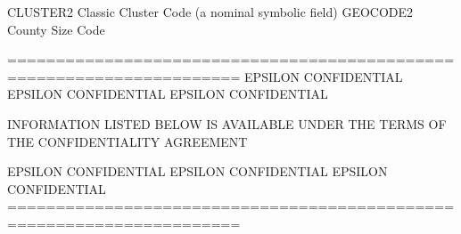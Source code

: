 \documentclass[
  11pt,
  a4paper,
  DIV=12,captions=tableheading,oneside,titlepage]{scrbook}
\let\oldverbatim\verbatim
\let\endoldverbatim\endverbatim
\renewenvironment{verbatim}{\footnotesize\oldverbatim}{\endoldverbatim}
\begin{document}
\begin{verbatim}
CLUSTER2                    Classic Cluster Code (a nominal symbolic field)
GEOCODE2                    County Size Code 

======================================================================
EPSILON CONFIDENTIAL      EPSILON CONFIDENTIAL    EPSILON CONFIDENTIAL

    INFORMATION LISTED BELOW IS AVAILABLE UNDER THE TERMS OF THE  
                      CONFIDENTIALITY AGREEMENT                

EPSILON CONFIDENTIAL      EPSILON CONFIDENTIAL    EPSILON CONFIDENTIAL
======================================================================

\end{verbatim}
\end{document}
